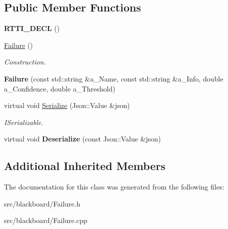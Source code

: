 \subsection*{Public Member Functions}
\begin{DoxyCompactItemize}
\item 
\mbox{\label{class_failure_a1f27e78c4983c4db41563903d4a18b90}} 
{\bfseries R\+T\+T\+I\+\_\+\+D\+E\+CL} ()
\item 
\mbox{\label{class_failure_afd1a1e0662adc20f77fc270ec1075fa8}} 
\hyperlink{class_failure_afd1a1e0662adc20f77fc270ec1075fa8}{Failure} ()
\begin{DoxyCompactList}\small\item\em Construction. \end{DoxyCompactList}\item 
\mbox{\label{class_failure_ad70ad8aeb9a3aede78e8ee0da9cffefb}} 
{\bfseries Failure} (const std\+::string \&a\+\_\+\+Name, const std\+::string \&a\+\_\+\+Info, double a\+\_\+\+Confidence, double a\+\_\+\+Threshold)
\item 
\mbox{\label{class_failure_a0c02713afa6aaeea93b52e6de7282e10}} 
virtual void \hyperlink{class_failure_a0c02713afa6aaeea93b52e6de7282e10}{Serialize} (Json\+::\+Value \&json)
\begin{DoxyCompactList}\small\item\em I\+Serializable. \end{DoxyCompactList}\item 
\mbox{\label{class_failure_a677852817f33eeeb4b81294b421a0584}} 
virtual void {\bfseries Deserialize} (const Json\+::\+Value \&json)
\end{DoxyCompactItemize}
\subsection*{Additional Inherited Members}


The documentation for this class was generated from the following files\+:\begin{DoxyCompactItemize}
\item 
src/blackboard/Failure.\+h\item 
src/blackboard/Failure.\+cpp\end{DoxyCompactItemize}
